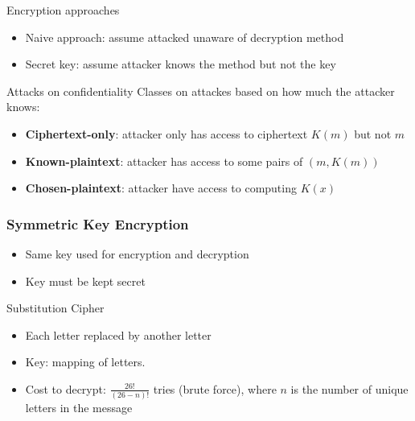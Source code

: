 \begin{knBox}
    {Encryption approaches}
    \begin{itemize}
        \item Naive approach: assume attacked unaware of decryption method
        \item Secret key: assume attacker knows the method but not the key
    \end{itemize}
\end{knBox}

\begin{theorem}
    {Attacks on confidentiality}
    Classes on attackes based on how much the attacker knows:
    \begin{itemize}
        \item \textbf{Ciphertext-only}: attacker only has access to ciphertext $K(m)$ but not $m$
        \item \textbf{Known-plaintext}: attacker has access to some pairs of $(m, K(m))$
        \item \textbf{Chosen-plaintext}: attacker have access to computing $K(x)$
    \end{itemize}
\end{theorem}


\subsubsection{Symmetric Key Encryption}

\begin{itemize}
    \item Same key used for encryption and decryption
    \item Key must be kept secret
\end{itemize}

\begin{knBox}
    {Substitution Cipher}
    \begin{itemize}
        \item Each letter replaced by another letter
        \item Key: mapping of letters.
        \item Cost to decrypt: $\frac{26!}{(26-n)!}$ tries (brute force), where $n$ is the number of unique letters in the message
    \end{itemize}
\end{knBox}

